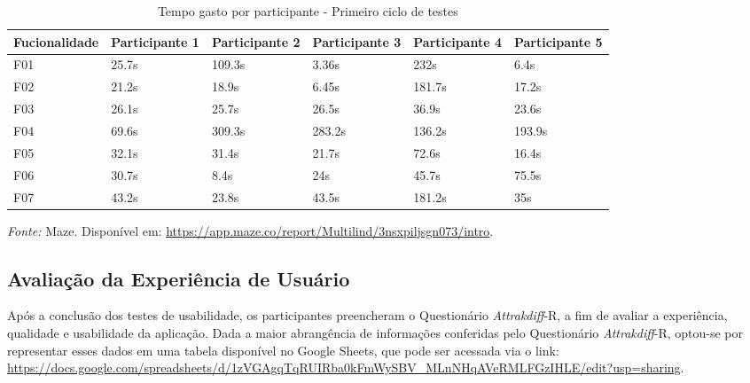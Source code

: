 \begin{table}[h!]
	\centering
	\caption{Tempo gasto por participante - Primeiro ciclo de testes}
	\label{tab06}
	\begin{adjustbox}{center}
	\begin{tabular}{l|l|l|l|l|l}
	\hline
	Fucionalidade & Participante 1 & Participante 2 & Participante 3 & Participante 4 & Participante 5 \\ 	\hline
	F01                   & 25.7s     & 109.3s     & 3.36s      & 232s       & 6.4s      \\
	F02                   & 21.2s        & 18.9s      & 6.45s      & 181.7s    & 17.2s     \\
	F03                   & 26.1s        & 25.7s      & 26.5s      & 36.9s     & 23.6s     \\
	F04                   & 69.6s        & 309.3s     & 283.2s     & 136.2s     & 193.9s     \\
	F05                   & 32.1s      & 31.4s      & 21.7s     & 72.6s     & 16.4s     \\
	F06                   & 30.7s     & 8.4s      & 24s     & 45.7s     & 75.5s     \\
	F07                   & 43.2s     & 23.8s      & 43.5s     & 181.2s    & 35s      \\ 	\hline
	\end{tabular}
	\end{adjustbox}
	\begin{tablenotes}[flushleft]
		\centering
		\item \textit{Fonte:} Maze. Disponível em: \url{https://app.maze.co/report/Multilind/3nsxpiljsgn073/intro}.
	  \end{tablenotes}
\end{table}

\subsection{Avaliação da Experiência de Usuário}
\label{sec:Avaliação da Experiência de Usuário}
Após a conclusão dos testes de usabilidade, os participantes preencheram o Questionário \textit{Attrakdiff}-R, a fim de 
avaliar a experiência, qualidade e usabilidade da aplicação. Dada a maior abrangência de informações conferidas pelo Questionário \textit{Attrakdiff}-R, optou-se por representar esses dados em uma tabela disponível no Google Sheets, que pode ser acessada via o link: 
\url{https://docs.google.com/spreadsheets/d/1zVGAgqTqRUIRba0kFmWySBV_MLnNHqAVeRMLFGzIHLE/edit?usp=sharing}. 

